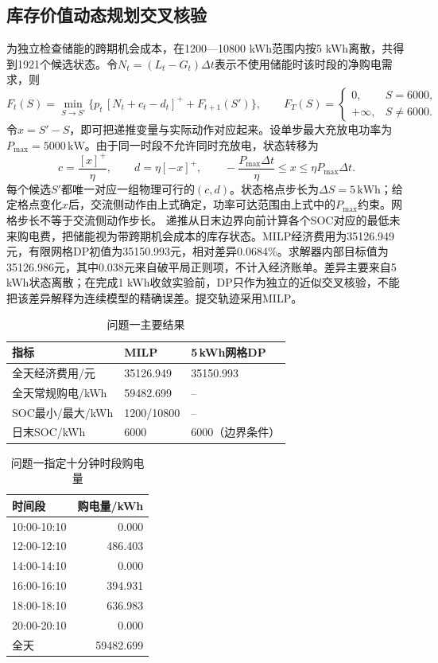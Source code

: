 \documentclass[UTF8,12pt,a4paper]{ctexart}
\begin{document}
\subsection{库存价值动态规划交叉核验}
为独立检查储能的跨期机会成本，在1200—10800 kWh范围内按5 kWh离散，共得到1921个候选状态。令$N_t=(L_t-G_t)\Delta t$表示不使用储能时该时段的净购电需求，则
\begin{equation}\label{eq:dp}
F_t(S)=\min_{S\to S'}\{p_t\,[N_t+c_t-d_t]^++F_{t+1}(S')\},\qquad F_T(S)=\begin{cases}0,&S=6000,\\+\infty,&S\ne6000.
\end{cases}
\end{equation}
令$x=S'-S$，即可把递推变量与实际动作对应起来。设单步最大充放电功率为$P_{\max}=5000\,\mathrm{kW}$。由于同一时段不允许同时充放电，状态转移为
\begin{equation}
c=\frac{[x]^+}{\eta},\qquad d=\eta[-x]^+,
\qquad -\frac{P_{\max}\Delta t}{\eta}\le x\le \eta P_{\max}\Delta t .
\end{equation}
每个候选$S'$都唯一对应一组物理可行的$(c,d)$。状态格点步长为$\Delta S=5\,\mathrm{kWh}$；给定格点变化$x$后，交流侧动作由上式确定，功率可达范围由上式中的$P_{\max}$约束。网格步长不等于交流侧动作步长。
递推从日末边界向前计算各个SOC对应的最低未来购电费，把储能视为带跨期机会成本的库存状态\cite{powell}。MILP经济费用为35126.949元，有限网格DP初值为35150.993元，相对差异0.0684\%。求解器内部目标值为35126.986元，其中0.038元来自破平局正则项，不计入经济账单。差异主要来自5 kWh状态离散；在完成1 kWh收敛实验前，DP只作为独立的近似交叉核验，不能把该差异解释为连续模型的精确误差。提交轨迹采用MILP。
\begin{table}[H]\centering\caption{问题一主要结果}\label{tab:q1main}\begin{tabular}{lll}\toprule 指标&MILP&5\,kWh网格DP\\\midrule
全天经济费用/元&35126.949&35150.993\\
全天常规购电/kWh&59482.699&--\\
SOC最小/最大/kWh&1200/10800&--\\
日末SOC/kWh&6000&6000（边界条件）\\\bottomrule\end{tabular}\end{table}
\begin{table}[H]\centering\small\caption{问题一指定十分钟时段购电量}\label{tab:q1purchase}\begin{tabular}{lr}\toprule 时间段&购电量/kWh\\\midrule
10:00-10:10&0.000\\
12:00-12:10&486.403\\
14:00-14:10&0.000\\
16:00-16:10&394.931\\
18:00-18:10&636.983\\
20:00-20:10&0.000\\
全天&59482.699\\\bottomrule\end{tabular}\end{table}
\end{document}

